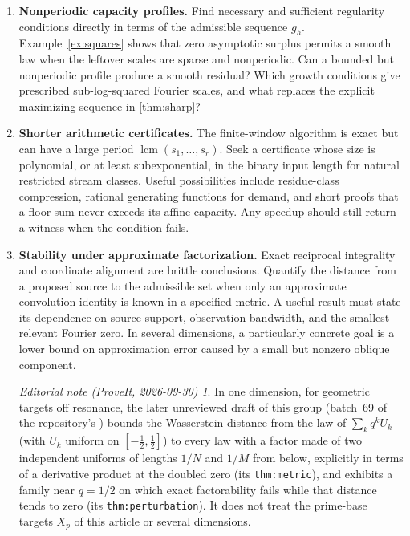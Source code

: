 \documentclass[11pt,a4paper]{article}
\theoremstyle{remark}
\newtheorem*{ednotelater}{Editorial note (ProveIt, 2026-09-30)}
\newcommand{\lcm}{\operatorname{lcm}}
\begin{document}
\begin{enumerate}[label=\textbf{Q\arabic*.},leftmargin=3em]
\item \textbf{Nonperiodic capacity profiles.}
Find necessary and sufficient regularity conditions directly in terms of the
admissible sequence $g_h$. Example~\ref{ex:squares} shows that zero asymptotic
surplus permits a smooth law when the leftover scales are sparse and nonperiodic.
Can a bounded but nonperiodic profile produce a smooth residual? Which growth
conditions give prescribed sub-log-squared Fourier scales, and what replaces the
explicit maximizing sequence in \cref{thm:sharp}?

\item \textbf{Shorter arithmetic certificates.}
The finite-window algorithm is exact but can have a large period
$\lcm(s_1,\ldots,s_r)$. Seek a certificate whose size is polynomial, or at least
subexponential, in the binary input length for natural restricted stream classes.
Useful possibilities include residue-class compression, rational generating
functions for demand, and short proofs that a floor-sum never exceeds its affine
capacity. Any speedup should still return a witness when the condition fails.

\item \textbf{Stability under approximate factorization.}
Exact reciprocal integrality and coordinate alignment are brittle conclusions.
Quantify the distance from a proposed source to the admissible set when only an
approximate convolution identity is known in a specified metric. A useful result
must state its dependence on source support, observation bandwidth, and the
smallest relevant Fourier zero. In several dimensions, a particularly concrete
goal is a lower bound on approximation error caused by a small but nonzero
oblique component.
\begin{ednotelater}
In one dimension, for geometric targets off resonance, the later unreviewed
draft
 of this
group (batch~69 of the repository's ) bounds the
Wasserstein distance from the law of $\sum_kq^kU_k$ (with $U_k$ uniform on
$[-\tfrac12,\tfrac12]$) to every law with a factor made of two independent
uniforms of lengths $1/N$ and $1/M$ from below,
explicitly in terms of a derivative product at the doubled zero (its
\texttt{thm:metric}), and exhibits a family near $q=1/2$ on which exact
factorability fails while that distance tends to zero (its
\texttt{thm:perturbation}). It does not treat the prime-base targets
$X_p$ of this article or several dimensions.
\end{ednotelater}


\end{enumerate}
\end{document}
